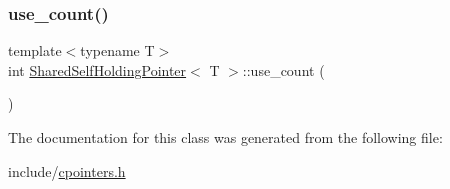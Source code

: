 \mbox{\label{classSharedSelfHoldingPointer_a09f8385ee224f32cc86261af7a9643b8}} 
\subsubsection{\texorpdfstring{use\+\_\+count()}{use\_count()}}
{\footnotesize\ttfamily template$<$typename T$>$ \\
int \hyperlink{classSharedSelfHoldingPointer}{Shared\+Self\+Holding\+Pointer}$<$ T $>$\+::use\+\_\+count (\begin{DoxyParamCaption}{ }\end{DoxyParamCaption})\hspace{0.3cm}{\ttfamily [inline]}}



The documentation for this class was generated from the following file\+:\begin{DoxyCompactItemize}
\item 
include/\hyperlink{cpointers_8h}{cpointers.\+h}\end{DoxyCompactItemize}
